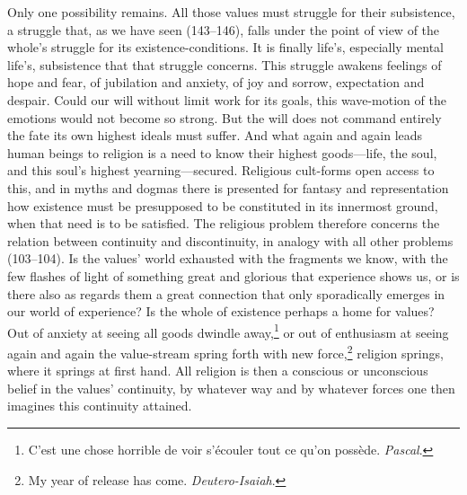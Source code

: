 \documentclass[12pt,a4paper]{book}
\newcommand{\opage}[1]{\marginnote{\footnotesize\textit{[#1]}}}
\begin{document}
Only one possibility remains. All those values must struggle for their subsistence, a struggle that,
as we have seen (143--146), falls under the point of view of the whole's struggle for its
existence-conditions. It is finally life's, especially mental life's, subsistence that that struggle
concerns. This struggle awakens feelings of hope and fear, of jubilation and anxiety, of joy and
sorrow, expectation and despair. Could our will without limit work for its goals, this wave-motion of
the emotions would not become so strong. But the will does not command entirely the fate its own
highest ideals must suffer. And what again and again leads human beings to religion is a need to know
their highest goods---life, the soul, and this soul's highest yearning---secured. Religious cult-forms
open access to this, and in myths and dogmas there is presented for fantasy and representation how
existence must be presupposed to be constituted in its innermost ground, when that need is to be
satisfied. The religious problem therefore concerns the relation between continuity and discontinuity,
in analogy with all other problems (103--104). Is the values' world exhausted with the fragments we
know, with the few flashes of light of something great and glorious that experience shows us, or is
there also as regards them a great connection that only sporadically emerges in our world of
experience? Is the whole of existence perhaps a home for values? Out of anxiety at seeing all goods
dwindle away,\footnote{C'est une chose horrible de voir s'écouler tout ce qu'on possède. \emph{Pascal}.}
or out of enthusiasm at seeing again and again the value-stream spring forth with new force,\footnote{My
year of release has come. \emph{Deutero-Isaiah}.} religion springs, where it springs at first hand. All
religion is then a conscious or unconscious belief in the values' \opage{376}continuity, by whatever way and by
whatever forces one then imagines this continuity attained.
\end{document}
